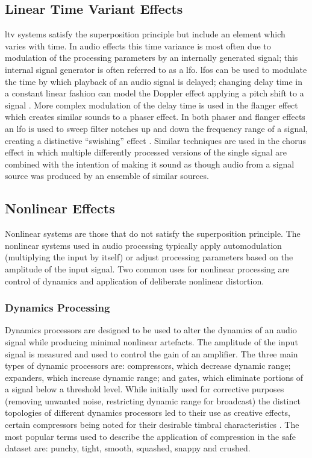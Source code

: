 	\subsection{Linear Time Variant Effects}
	\label{sec:Timbre-AudioProcessing-LTV}
		\acrshort{ltv} systems satisfy the superposition principle but include an element which varies with time.
		In audio effects this time variance is most often due to modulation of the processing parameters by an
		internally generated signal; this internal signal generator is often referred to as a \acrfull{lfo}.
		\acrshort{lfo}s can be used to modulate the time by which playback of an audio signal is delayed; changing
		delay time in a constant linear fashion can model the Doppler effect applying a pitch shift to a signal
		\citep{dattorro1997effect}. More complex modulation of the delay time is used in the flanger effect which
		creates similar sounds to a phaser effect. In both phaser and flanger effects an \acrshort{lfo} is used to
		sweep filter notches up and down the frequency range of a signal, creating a distinctive ``swishing''
		effect \citep{huber2010modern}. Similar techniques are used in the chorus effect in which multiple
		differently processed versions of the single signal are combined with the intention of making it sound as
		though audio from a signal source was produced by an ensemble of similar sources.

	\subsection{Nonlinear Effects}
	\label{sec:Timbre-AudioProcessing-Nonlinear}
		Nonlinear systems are those that do not satisfy the superposition principle. The nonlinear systems used in
		audio processing typically apply automodulation (multiplying the input by itself) or adjust processing
		parameters based on the amplitude of the input signal. Two common uses for nonlinear processing are control
		of dynamics and application of deliberate nonlinear distortion.

		\subsubsection*{Dynamics Processing}
			Dynamics processors are designed to be used to alter the dynamics of an audio signal while
			producing minimal nonlinear artefacts. The amplitude of the input signal is measured and used to
			control the gain of an amplifier. The three main types of dynamic processors are: compressors,
			which decrease dynamic range; expanders, which increase dynamic range; and gates, which eliminate
			portions of a signal below a threshold level. While initially used for corrective purposes
			(removing unwanted noise, restricting dynamic range for broadcast) the distinct topologies of
			different dynamics processors led to their use as creative effects, certain compressors being noted
			for their desirable timbral characteristics \citep{moore2016an}. The most popular terms used to
			describe the application of compression in the \acrshort{safe} dataset are: punchy, tight, smooth,
			squashed, snappy and crushed.

